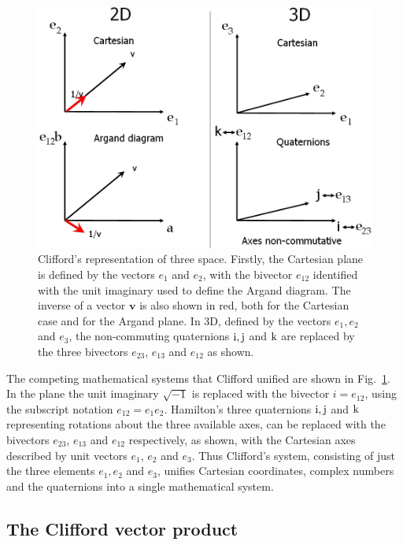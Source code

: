 \documentclass[prb,preprint]{revtex4}
\newcommand{\iGAT}{{i}}
\begin{document}
\begin{figure}[htb]

\begin{center}
\includegraphics[width=4.8in]{CoordSystems}
\end{center}

\caption{Clifford's representation of three space. Firstly, the Cartesian plane is defined by the vectors $ e_1 $ and $ e_2 $, with the bivector $ e_{12} $ identified with the unit imaginary used to define the Argand diagram. The inverse of a vector $ \boldsymbol{v} $ is also shown in red, both for the Cartesian case and for the Argand plane. In 3D, defined by the vectors $ e_1, e_2 $ and $ e_3 $, the non-commuting quaternions $ \rm{i},\rm{j} $ and $ \rm{k} $ are replaced by the three bivectors $ e_{23} $, $ e_{13} $ and $ e_{12} $ as shown.  \label{CoordSystems}}
\end{figure}
The competing mathematical systems that Clifford unified are shown in Fig.~\ref{CoordSystems}.  In the plane the unit imaginary $ \sqrt{-1} $ is replaced with the bivector $ \iGAT = e_{12} $, using the subscript notation $ e_{12} =  e_1 e_2 $.  
Hamilton's three quaternions $ \rm{i},\rm{j} $ and $ \rm{k} $ representing rotations about the three available axes, can be replaced with the bivectors $ e_{23} $, $ e_{13} $ and $ e_{12} $ respectively, as shown, with the Cartesian axes described by unit vectors $ e_1 $, $ e_2 $ and $ e_3 $. Thus Clifford's system, consisting of just the three elements $ e_1 , e_2 $ and $ e_3 $, unifies Cartesian coordinates,  complex numbers and the quaternions into a single mathematical system.

\subsection{The Clifford vector product}
\end{document}
